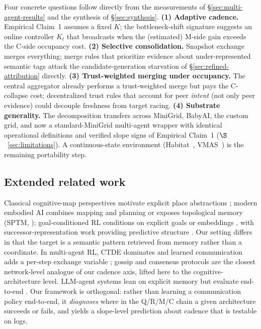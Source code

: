 \documentclass{article}
\begin{document}
Four concrete questions follow directly from the measurements of \S\ref{sec:multi-agent-results} and the synthesis of \S\ref{sec:synthesis}.
\textbf{(1) Adaptive cadence.} Empirical Claim~1 assumes a fixed $K$; the bottleneck-shift signature suggests an online controller $K_t$ that broadcasts when the (estimated) M-side gain exceeds the C-side occupancy cost.
\textbf{(2) Selective consolidation.} Snapshot exchange merges everything; merge rules that prioritize evidence about under-represented semantic tags attack the candidate-generation starvation of \S\ref{sec:refined-attribution} directly.
\textbf{(3) Trust-weighted merging under occupancy.} The central aggregator already performs a trust-weighted merge but pays the C-collapse cost; decentralized trust rules that account for peer \emph{intent} (not only peer evidence) could decouple freshness from target racing.
\textbf{(4) Substrate generality.} The decomposition transfers across MiniGrid, BabyAI, the custom grid, and now a standard-MiniGrid multi-agent wrapper with identical operational definitions and verified slope signs of Empirical Claim~1 ($\S$~\ref{sec:limitations}). A continuous-state environment (Habitat~\citep{savva2019habitat}, VMAS~\citep{bettini2022vmas}) is the remaining portability step.

\subsection{Extended related work}
\label{app:related-work-extended}

Classical cognitive-map perspectives motivate explicit place abstractions \citep{tolman1948cognitive,okeefe1978hippocampus,kuipers2000spatial}; modern embodied AI combines mapping and planning \citep{gupta2017cognitive} or exposes topological memory (SPTM, \citealp{savinov2018semi}); goal-conditioned RL conditions on explicit goals or embeddings \citep{andrychowicz2017hindsight,ghosh2021learning}, with successor-representation work providing predictive structure \citep{dayan1993improving,stachenfeld2017hippocampus,momennejad2017successor}. Our setting differs in that the target is a semantic pattern retrieved from memory rather than a coordinate. In multi-agent RL, CTDE dominates \citep{lowe2017maddpg,foerster2018ctde} and learned communication adds a per-step exchange variable \citep{sukhbaatar2016commnet,foerster2016learning}; gossip and consensus protocols \citep{boyd2006gossip,xiao2007distributed} are the closest network-level analogue of our cadence axis, lifted here to the cognitive-architecture level. LLM-agent systems lean on explicit memory but evaluate end-to-end \citep{wang2023voyager,shinn2023reflexion,packer2023memgpt}. Our framework is orthogonal: rather than learning a communication policy end-to-end, it \emph{diagnoses} where in the Q/R/M/C chain a given architecture succeeds or fails, and yields a slope-level prediction about cadence that is testable on logs.
\end{document}
